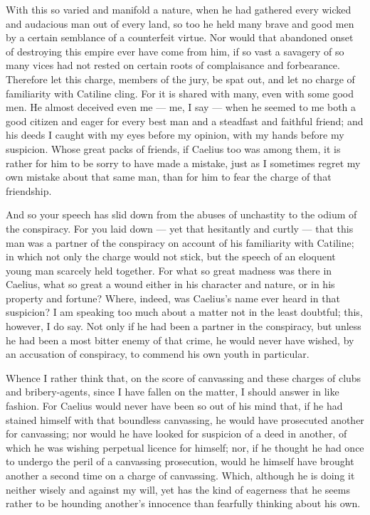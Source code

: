  With this so varied and manifold a nature, when he had gathered every wicked and audacious man out of every land, so too he held many brave and good men by a certain semblance of a counterfeit virtue. Nor would that abandoned onset of destroying this empire ever have come from him, if so vast a savagery of so many vices had not rested on certain roots of complaisance and forbearance. Therefore let this charge, members of the jury, be spat out, and let no charge of familiarity with Catiline cling. For it is shared with many, even with some good men. He almost deceived even me --- me, I say --- when he seemed to me both a good citizen and eager for every best man and a steadfast and faithful friend; and his deeds I caught with my eyes before my opinion, with my hands before my suspicion. Whose great packs of friends, if Caelius too was among them, it is rather for him to be sorry to have made a mistake, just as I sometimes regret my own mistake about that same man, than for him to fear the charge of that friendship.

 And so your speech has slid down from the abuses of unchastity to the odium of the conspiracy. For you laid down --- yet that hesitantly and curtly --- that this man was a partner of the conspiracy on account of his familiarity with Catiline; in which not only the charge would not stick, but the speech of an eloquent young man scarcely held together. For what so great madness was there in Caelius, what so great a wound either in his character and nature, or in his property and fortune? Where, indeed, was Caelius's name ever heard in that suspicion? I am speaking too much about a matter not in the least doubtful; this, however, I do say. Not only if he had been a partner in the conspiracy, but unless he had been a most bitter enemy of that crime, he would never have wished, by an accusation of conspiracy, to commend his own youth in particular.

 Whence I rather think that, on the score of canvassing and these charges of clubs and bribery-agents, since I have fallen on the matter, I should answer in like fashion. For Caelius would never have been so out of his mind that, if he had stained himself with that boundless canvassing, he would have prosecuted another for canvassing; nor would he have looked for suspicion of a deed in another, of which he was wishing perpetual licence for himself; nor, if he thought he had once to undergo the peril of a canvassing prosecution, would he himself have brought another a second time on a charge of canvassing. Which, although he is doing it neither wisely and against my will, yet has the kind of eagerness that he seems rather to be hounding another's innocence than fearfully thinking about his own.

